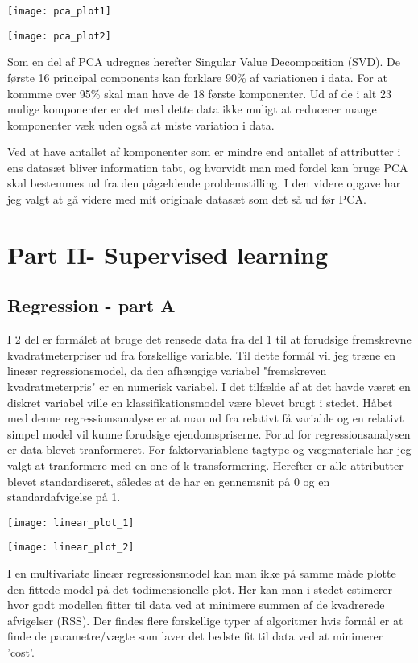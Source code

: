 \documentclass{report}
\begin{document}
\texttt{[image: pca\_plot1]}

\texttt{[image: pca\_plot2]}

Som en del af PCA udregnes herefter Singular Value Decomposition (SVD).
De første 16 principal components kan forklare 90\% af variationen i data. For at kommme over 95\% skal man have de 18 første komponenter. Ud af de i alt 23 mulige komponenter er det med dette data ikke muligt at reducerer mange komponenter væk uden også at miste variation i data. 

Ved at have antallet af komponenter som er mindre end antallet af attributter i ens datasæt bliver information tabt, og hvorvidt man med fordel kan bruge PCA skal bestemmes ud fra den pågældende problemstilling. I den videre opgave har jeg valgt at gå videre med mit originale datasæt som det så ud før PCA. 

\chapter{Part II- Supervised learning}

\section{Regression - part A}
I 2 del er formålet at bruge det rensede data fra del 1 til at forudsige fremskrevne kvadratmeterpriser ud fra forskellige variable. Til dette formål vil jeg træne en lineær regressionsmodel, da den afhængige variabel "fremskreven kvadratmeterpris" er en numerisk variabel. I det tilfælde af at det havde været en diskret variabel ville en klassifikationsmodel være blevet brugt i stedet.
Håbet med denne regressionsanalyse er at man ud fra relativt få variable og en relativt simpel model vil kunne forudsige ejendomspriserne. 
Forud for regressionsanalysen er data blevet tranformeret. For faktorvariablene tagtype og vægmateriale har jeg valgt at tranformere med en one-of-k transformering. Herefter er alle attributter blevet standardiseret, således at de har en gennemsnit på 0 og en standardafvigelse på 1. 

\texttt{[image: linear\_plot\_1]}

\texttt{[image: linear\_plot\_2]}

I en multivariate lineær regressionsmodel kan man ikke på samme måde plotte den fittede model på det todimensionelle plot. Her kan man i stedet estimerer hvor godt modellen fitter til data ved at minimere summen af de kvadrerede afvigelser (RSS). 
Der findes flere forskellige typer af algoritmer hvis formål er at finde de parametre/vægte som laver det bedste fit til data ved at minimerer 'cost'. 
\end{document}
